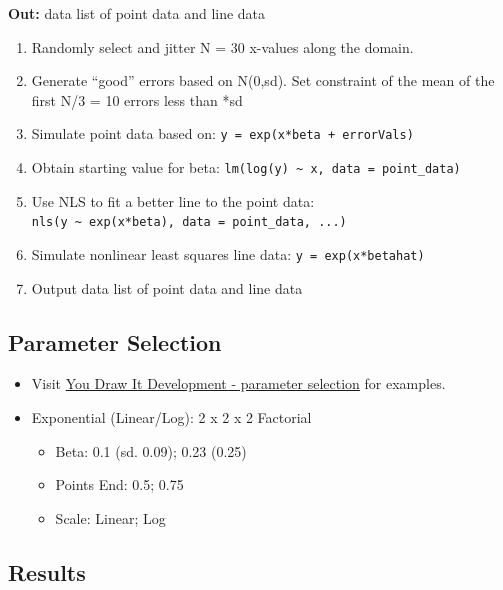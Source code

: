 \documentclass[print]{nuthesis}
\providecommand{\tightlist}{%
  \setlength{\itemsep}{0pt}\setlength{\parskip}{0pt}}
\begin{document}
\textbf{Out:} data list of point data and line data

\begin{enumerate}
\def\labelenumi{\arabic{enumi}.}
\tightlist
\item
  Randomly select and jitter N = 30 x-values along the domain.
\item
  Generate ``good'' errors based on N(0,sd). Set constraint of the mean of the first N/3 = 10 errors less than *sd\textbar{}
\item
  Simulate point data based on: \texttt{y\ =\ exp(x*beta\ +\ errorVals)}
\item
  Obtain starting value for beta: \texttt{lm(log(y)\ \textasciitilde{}\ x,\ data\ =\ point\_data)}
\item
  Use NLS to fit a better line to the point data: \texttt{nls(y\ \textasciitilde{}\ exp(x*beta),\ data\ =\ point\_data,\ ...)}
\item
  Simulate nonlinear least squares line data: \texttt{y\ =\ exp(x*betahat)}
\item
  Output data list of point data and line data
\end{enumerate}

\hypertarget{parameter-selection-1}{%
\subsection{Parameter Selection}\label{parameter-selection-1}}

\begin{itemize}
\item
  Visit \href{https://emily-robinson.shinyapps.io/you-draw-it-parameter-selection/}{You Draw It Development - parameter selection} for examples.
\item
  Exponential (Linear/Log): 2 x 2 x 2 Factorial

  \begin{itemize}
  \tightlist
  \item
    Beta: 0.1 (sd. 0.09); 0.23 (0.25)
  \item
    Points End: 0.5; 0.75
  \item
    Scale: Linear; Log
  \end{itemize}
\end{itemize}

\hypertarget{results-2}{%
\subsection{Results}\label{results-2}}
\end{document}
